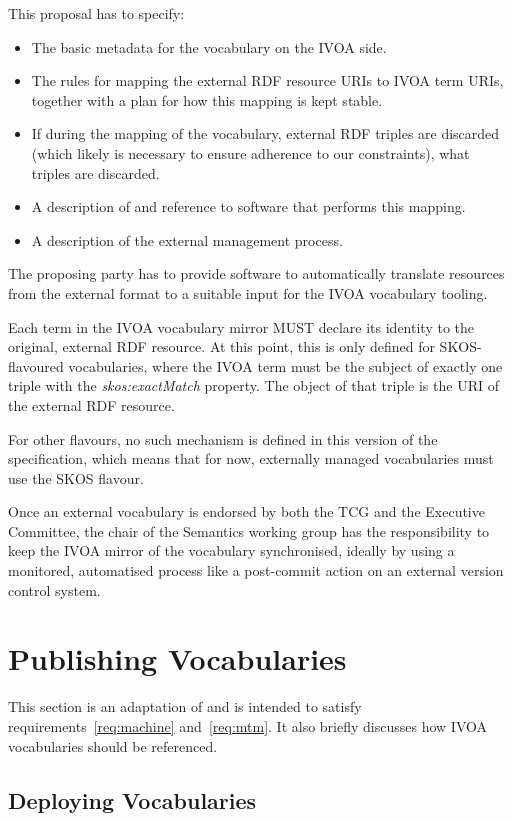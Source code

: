 \documentclass[11pt,a4paper]{ivoa}
\newcommand{\vocterm}[1]{\emph{\color{termcolor}#1}}
\begin{document}
This proposal has to specify:
\begin{itemize}
\item The basic metadata for the vocabulary on the IVOA side.
\item The rules for mapping the external RDF resource URIs to IVOA term
URIs, together with a plan for how this mapping is kept stable.
\item If during the mapping of the vocabulary, external RDF triples are
discarded (which likely is necessary to ensure adherence to our
constraints), what triples are discarded.
\item A description of and reference to software that performs this
mapping.
\item A description of the external management process.
\end{itemize}

The proposing party has to provide software to automatically translate
resources from the external format to a suitable input for the IVOA
vocabulary tooling.

Each term in the IVOA vocabulary mirror MUST declare its identity to
the original, external RDF resource.  At this point, this is only
defined for SKOS-flavoured vocabularies, where the IVOA term must be the
subject of exactly one triple with the \vocterm{skos:exactMatch}
property.  The object of that triple is the URI of the external RDF
resource.

For other flavours, no such mechanism is defined in this version of the
specification, which means that for now, externally managed vocabularies
must use the SKOS flavour.

Once an external vocabulary is endorsed by both the TCG and the
Executive Committee, the chair of the Semantics working group has the
responsibility to keep the IVOA mirror of the vocabulary synchronised,
ideally by using a monitored, automatised process like a post-commit
action on an external version control system.


\section{Publishing Vocabularies}
\label{sect:deployment}

This section is an adaptation of \citet{note:cooluris} and is
intended to satisfy requirements~\ref{req:machine}
and~\ref{req:mtm}.  It also briefly discusses how IVOA vocabularies
should be referenced.

\subsection{Deploying Vocabularies}
\end{document}
